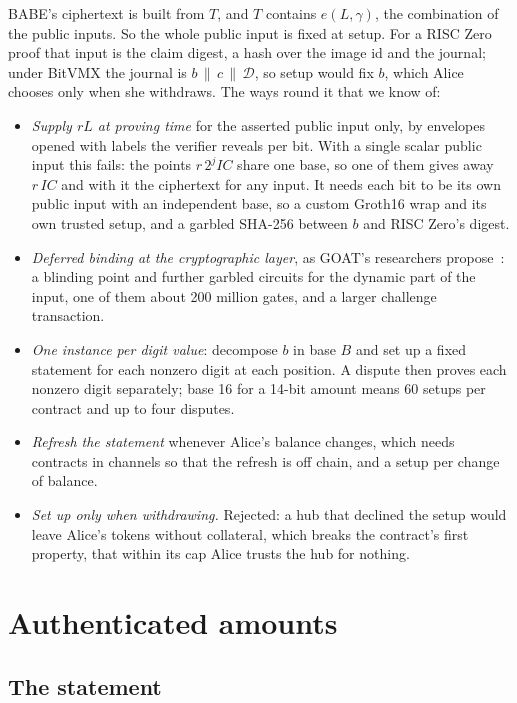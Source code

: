 \documentclass[11pt]{article}
\begin{document}
BABE's ciphertext is built from $T$, and $T$ contains $e(L, \gamma)$,
the combination of the public inputs. So the whole public input is fixed
at setup. For a RISC Zero proof that input is the claim digest, a hash
over the image id and the journal; under BitVMX the journal is
$b \,\|\, c \,\|\, \mathcal{D}$, so setup would fix $b$, which Alice chooses only
when she withdraws. The ways round it that we know of:
\begin{itemize}[leftmargin=1.5em]
\item \emph{Supply $rL$ at proving time} for the asserted public input
  only, by envelopes opened with labels the verifier reveals per bit.
  With a single scalar public input this fails: the points
  $r\,2^j\mathit{IC}$ share one base, so one of them gives away
  $r\,\mathit{IC}$ and with it the ciphertext for any input. It needs
  each bit to be its own public input with an independent base, so a
  custom Groth16 wrap and its own trusted setup, and a garbled SHA-256
  between $b$ and RISC Zero's digest.
\item \emph{Deferred binding at the cryptographic layer}, as GOAT's
  researchers propose~\cite{goat}: a blinding point and further garbled
  circuits for the dynamic part of the input, one of them about 200
  million gates, and a larger challenge transaction.
\item \emph{One instance per digit value}: decompose $b$ in base $B$ and
  set up a fixed statement for each nonzero digit at each position. A
  dispute then proves each nonzero digit separately; base 16 for a
  14-bit amount means 60 setups per contract and up to four disputes.
\item \emph{Refresh the statement} whenever Alice's balance changes,
  which needs contracts in channels so that the refresh is off chain,
  and a setup per change of balance.
\item \emph{Set up only when withdrawing.} Rejected: a hub that declined
  the setup would leave Alice's tokens without collateral, which breaks
  the contract's first property, that within its cap Alice trusts the
  hub for nothing.
\end{itemize}

\section{Authenticated amounts}
\label{sec:auth}

\subsection{The statement}
\end{document}
